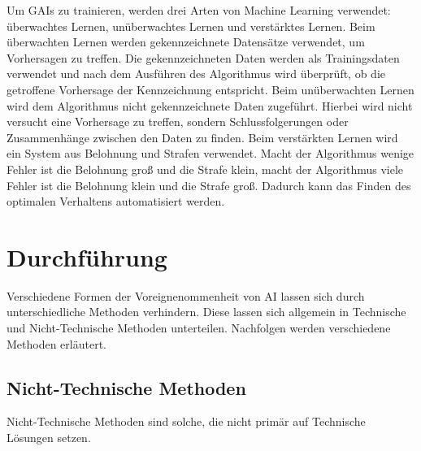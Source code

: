 \documentclass[12pt]{article}
\begin{document}
Um GAIs zu trainieren, werden drei Arten von Machine Learning verwendet: überwachtes Lernen, unüberwachtes Lernen und verstärktes Lernen. 
Beim überwachten Lernen werden gekennzeichnete Datensätze verwendet, um Vorhersagen zu treffen. Die gekennzeichneten Daten werden als Trainingsdaten verwendet und nach dem Ausführen des Algorithmus wird überprüft, ob die getroffene Vorhersage der Kennzeichnung entspricht.
Beim unüberwachten Lernen wird dem Algorithmus nicht gekennzeichnete Daten zugeführt. Hierbei wird nicht versucht eine Vorhersage zu treffen, sondern Schlussfolgerungen oder Zusammenhänge zwischen den Daten zu finden.
Beim verstärkten Lernen wird ein System aus Belohnung und Strafen verwendet. Macht der Algorithmus wenige Fehler ist die Belohnung groß und die Strafe klein, macht der Algorithmus viele Fehler ist die Belohnung klein und die Strafe groß. Dadurch kann das Finden des 
optimalen Verhaltens automatisiert werden.

\section{Durchführung}
Verschiedene Formen der Voreignenommenheit von AI lassen sich durch unterschiedliche Methoden verhindern. Diese lassen sich allgemein in 
Technische und Nicht-Technische Methoden unterteilen. Nachfolgen werden verschiedene Methoden erläutert.
\subsection{Nicht-Technische Methoden}
Nicht-Technische Methoden sind solche, die nicht primär auf Technische Lösungen setzen.
\end{document}
